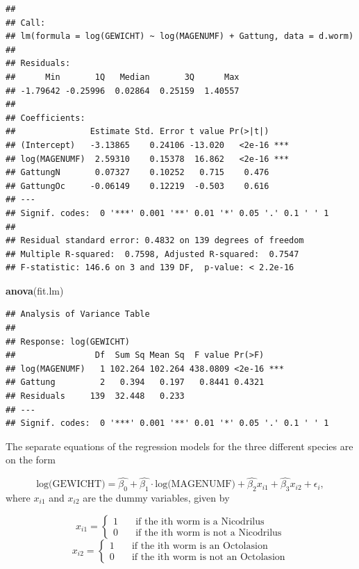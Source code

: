 \documentclass[
]{article}
\newenvironment{Shaded}{\begin{snugshade}}{\end{snugshade}}
\newcommand{\KeywordTok}[1]{\textcolor[rgb]{0.13,0.29,0.53}{\textbf{#1}}}
\newcommand{\NormalTok}[1]{#1}
\begin{document}
\begin{verbatim}
## 
## Call:
## lm(formula = log(GEWICHT) ~ log(MAGENUMF) + Gattung, data = d.worm)
## 
## Residuals:
##      Min       1Q   Median       3Q      Max 
## -1.79642 -0.25996  0.02864  0.25159  1.40557 
## 
## Coefficients:
##               Estimate Std. Error t value Pr(>|t|)    
## (Intercept)   -3.13865    0.24106 -13.020   <2e-16 ***
## log(MAGENUMF)  2.59310    0.15378  16.862   <2e-16 ***
## GattungN       0.07327    0.10252   0.715    0.476    
## GattungOc     -0.06149    0.12219  -0.503    0.616    
## ---
## Signif. codes:  0 '***' 0.001 '**' 0.01 '*' 0.05 '.' 0.1 ' ' 1
## 
## Residual standard error: 0.4832 on 139 degrees of freedom
## Multiple R-squared:  0.7598, Adjusted R-squared:  0.7547 
## F-statistic: 146.6 on 3 and 139 DF,  p-value: < 2.2e-16
\end{verbatim}

\begin{Shaded}
\begin{Highlighting}[]
\KeywordTok{anova}\NormalTok{(fit.lm)}
\end{Highlighting}
\end{Shaded}

\begin{verbatim}
## Analysis of Variance Table
## 
## Response: log(GEWICHT)
##                Df  Sum Sq Mean Sq  F value Pr(>F)    
## log(MAGENUMF)   1 102.264 102.264 438.0809 <2e-16 ***
## Gattung         2   0.394   0.197   0.8441 0.4321    
## Residuals     139  32.448   0.233                    
## ---
## Signif. codes:  0 '***' 0.001 '**' 0.01 '*' 0.05 '.' 0.1 ' ' 1
\end{verbatim}

The separate equations of the regression models for the three different
species are on the form

\[
\text{log(GEWICHT)} = \hat{\beta_0} + \hat{\beta_1} \cdot \text{log(MAGENUMF)} + \hat{\beta_2} x_{i1} + \hat{\beta_3} x_{i2} + \epsilon_i,
\] where \(x_{i1}\) and \(x_{i2}\) are the dummy variables, given by

\[
  x_{i1} =  
  \begin{cases} 
    1 &\quad \text{if the ith worm is a Nicodrilus} \\
    0 &\quad \text{if the ith worm is not a Nicodrilus}
  \end{cases}
\] \[
  x_{i2} =  
  \begin{cases} 
    1 &\quad \text{if the ith worm is an Octolasion} \\
    0 &\quad \text{if the ith worm is not an Octolasion}
  \end{cases}
\]
\end{document}
